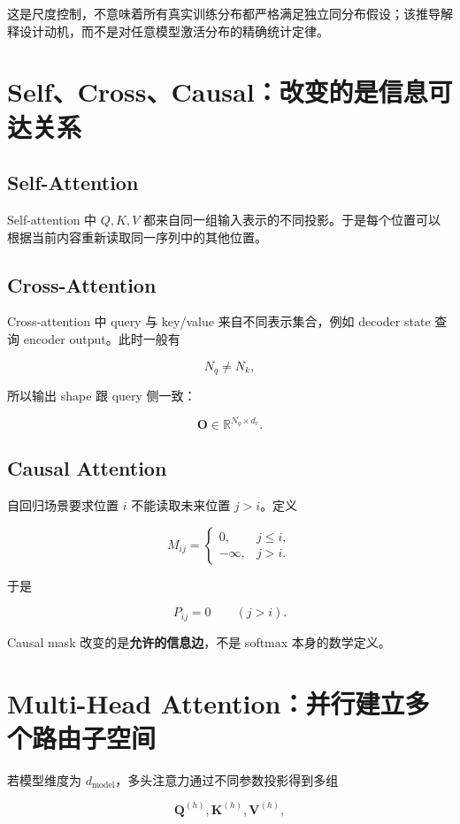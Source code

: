 \documentclass[profile=standard,twoside=false]{ipara-handbook}
\begin{document}
这是尺度控制，不意味着所有真实训练分布都严格满足独立同分布假设；该推导解释设计动机，而不是对任意模型激活分布的精确统计定律。

\section{Self、Cross、Causal：改变的是信息可达关系}

\subsection{Self-Attention}

Self-attention 中 $Q,K,V$ 都来自同一组输入表示的不同投影。于是每个位置可以根据当前内容重新读取同一序列中的其他位置。

\subsection{Cross-Attention}

Cross-attention 中 query 与 key/value 来自不同表示集合，例如 decoder state 查询 encoder output。此时一般有

$$
N_q\neq N_k,
$$

所以输出 shape 跟 query 侧一致：

$$
\boldsymbol{O}\in\mathbb{R}^{N_q\times d_v}.
$$

\subsection{Causal Attention}

自回归场景要求位置 $i$ 不能读取未来位置 $j>i$。定义

$$
M_{ij}
=
\begin{cases}
0,& j\le i,\\
-\infty,& j>i.
\end{cases}
$$

于是

$$
P_{ij}=0\qquad(j>i).
$$

Causal mask 改变的是\textbf{允许的信息边}，不是 softmax 本身的数学定义。

\section{Multi-Head Attention：并行建立多个路由子空间}

若模型维度为 $d_{\text{model}}$，多头注意力通过不同参数投影得到多组

$$
\boldsymbol{Q}^{(h)},\boldsymbol{K}^{(h)},\boldsymbol{V}^{(h)},
$$
\end{document}
